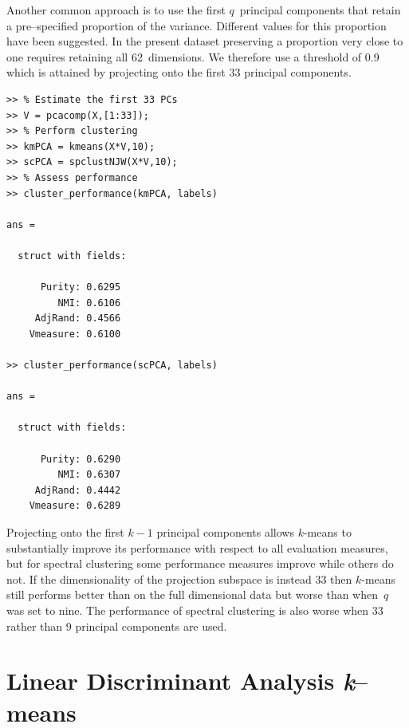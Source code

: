 \documentclass{book}
\begin{document}
\noindent
%
Another common approach is to use the first $q$~principal components that
retain a pre--specified proportion of the variance. Different values for this
proportion have been suggested. In the present dataset preserving a proportion
very close to one requires retaining all 62~dimensions.  We therefore use a
threshold of 0.9 which is attained by projecting onto the first 33 principal
components.

\begin{verbatim}
>> % Estimate the first 33 PCs
>> V = pcacomp(X,[1:33]);
>> % Perform clustering
>> kmPCA = kmeans(X*V,10);
>> scPCA = spclustNJW(X*V,10);
>> % Assess performance
>> cluster_performance(kmPCA, labels)

ans = 

  struct with fields:

      Purity: 0.6295
         NMI: 0.6106
     AdjRand: 0.4566
    Vmeasure: 0.6100

>> cluster_performance(scPCA, labels)

ans = 

  struct with fields:

      Purity: 0.6290
         NMI: 0.6307
     AdjRand: 0.4442
    Vmeasure: 0.6289

\end{verbatim}


\noindent
%
Projecting onto the first $k-1$ principal components allows $k$-means to
substantially improve its performance with respect to all evaluation
measures, but for spectral clustering some performance measures improve
while others do not. If the
dimensionality of the projection subspace is instead 33 then $k$-means
still performs better than on the full dimensional data but worse than
when~$q$ was set to nine. The performance of spectral clustering is also
worse when 33 rather than 9 principal components are used.

\section{Linear Discriminant Analysis {\it k}--means}
\end{document}
